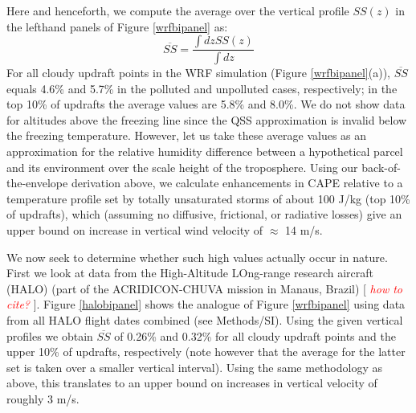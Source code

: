 \documentclass{article}
\newcommand{\klcomm}[1]{\textcolor{red}{\textit{#1}}}
\begin{document}
\clearpage
\newpage

Here and henceforth, we compute the average over the vertical profile $SS(z)$ in the lefthand panels of Figure \ref{wrfbipanel} as:
\begin{equation}
\label{avgss}
\overline{SS} = \frac{\int dz SS(z)}{\int dz}
\end{equation}
For all cloudy updraft points in the WRF simulation (Figure \ref{wrfbipanel}(a)), $\overline{SS}$ equals 4.6\% and 5.7\% in the polluted and unpolluted cases, respectively; in the top 10\% of updrafts the average values are 5.8\% and 8.0\%. We do not show data for altitudes above the freezing line since the QSS approximation is invalid below the freezing temperature. However, let us take these average values as an approximation for the relative humidity difference between a hypothetical parcel and its environment over the scale height of the troposphere. Using our back-of-the-envelope derivation above, we calculate enhancements in CAPE relative to a temperature profile set by totally unsaturated storms of about 100 J/kg (top 10\% of updrafts), which (assuming no diffusive, frictional, or radiative losses) give an upper bound on increase in vertical wind velocity of $\approx$ 14 m/s.

We now seek to determine whether such high values actually occur in nature. First we look at data from the High-Altitude LOng-range research aircraft (HALO) (part of the ACRIDICON-CHUVA mission in Manaus, Brazil) [ \klcomm{how to cite?} ]. Figure \ref{halobipanel} shows the analogue of Figure \ref{wrfbipanel} using data from all HALO flight dates combined (see Methods/SI). Using the given vertical profiles we obtain $\overline{SS}$ of 0.26\% and 0.32\% for all cloudy updraft points and the upper 10\% of updrafts, respectively (note however that the average for the latter set is taken over a smaller vertical interval). Using the same methodology as above, this translates to an upper bound on increases in vertical velocity of roughly 3 m/s. 

\clearpage
\newpage

\end{document}
